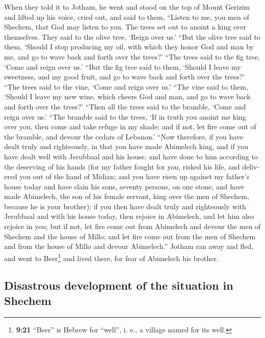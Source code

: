 \begin{paracol}{2}
\begin{otherlanguage}{english}
 When they told it to Jotham, he went and stood on the top
of Mount Gerizim and lifted up his voice, cried out, and said to them,
``Listen to me, you men of Shechem, that God may listen to you.
 The trees set out to anoint a king over themselves. They
said to the olive tree, `Reign over us.'  ``But the olive
tree said to them, `Should I stop producing my oil, with which they
honor God and man by me, and go to wave back and forth over the trees?'
 ``The trees said to the fig tree, `Come and reign over
us.'  ``But the fig tree said to them, `Should I leave my
sweetness, and my good fruit, and go to wave back and forth over the
trees?'  ``The trees said to the vine, `Come and reign
over us.'  ``The vine said to them, `Should I leave my
new wine, which cheers God and man, and go to wave back and forth over
the trees?'  ``Then all the trees said to the bramble,
`Come and reign over us.'  ``The bramble said to the
trees, `If in truth you anoint me king over you, then come and take
refuge in my shade; and if not, let fire come out of the bramble, and
devour the cedars of Lebanon.'  ``Now therefore, if you
have dealt truly and righteously, in that you have made Abimelech king,
and if you have dealt well with Jerubbaal and his house, and have done
to him according to the deserving of his hands  (for my
father fought for you, risked his life, and delivered you out of the
hand of Midian;  and you have risen up against my
father's house today and have slain his sons, seventy persons, on one
stone, and have made Abimelech, the son of his female servant, king over
the men of Shechem, because he is your brother);  if you
then have dealt truly and righteously with Jerubbaal and with his house
today, then rejoice in Abimelech, and let him also rejoice in you;
 but if not, let fire come out from Abimelech and devour
the men of Shechem and the house of Millo; and let fire come out from
the men of Shechem and from the house of Millo and devour Abimelech.''
 Jotham ran away and fled, and went to Beer\footnote{\textbf{9:21}
  ``Beer'' is Hebrew for ``well'', i. e., a village named for its well.}
and lived there, for fear of Abimelech his brother.

\hypertarget{disastrous-development-of-the-situation-in-shechem}{%
\subsection{Disastrous development of the situation in
Shechem}\label{disastrous-development-of-the-situation-in-shechem}}


\end{otherlanguage}
\end{paracol}
